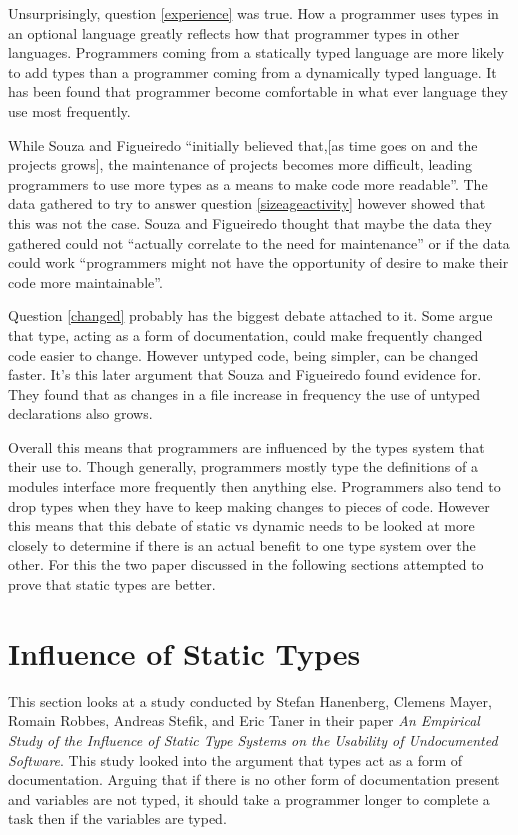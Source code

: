 \documentclass{sig-alternate}
\begin{document}
Unsurprisingly, question \ref{experience} was true. How a programmer uses types in an optional language greatly reflects how that programmer types in other languages. Programmers coming from a statically typed language are more likely to add types than a programmer coming from a dynamically typed language. It has been found that programmer become comfortable in what ever language they use most frequently.

While Souza and Figueiredo ``initially believed that,[as time goes on and the projects grows], the maintenance of projects becomes more difficult, leading programmers to use more types as a means to make code more readable''. The data gathered to try to answer question \ref{sizeageactivity} however showed that this was not the case. Souza and Figueiredo thought that maybe the data they gathered could not ``actually correlate to the need for maintenance'' or if the data could work ``programmers might not have the opportunity of desire to make their code more maintainable''.

Question \ref{changed} probably has the biggest debate attached to it. Some argue that type, acting as a form of documentation, could make frequently changed code easier to change. However untyped code, being simpler, can be changed faster. It's this later argument that Souza and Figueiredo found evidence for. They found that as changes in a file increase in frequency the use of untyped declarations also grows.

Overall this means that programmers are influenced by the types system that their use to. Though generally, programmers mostly type the definitions of a modules interface more frequently then anything else. Programmers also tend to drop types when they have to keep making changes to pieces of code. However this means that this debate of static vs dynamic needs to be looked at more closely to determine if there is an actual benefit to one type system over the other. For this the two paper discussed in the following sections attempted to prove that static types are better. 

\section{Influence of Static Types}\label{influence}
This section looks at a study conducted by Stefan Hanenberg, Clemens Mayer, Romain Robbes, Andreas Stefik, and Eric Taner in their paper \emph{An Empirical Study of the Influence of Static Type Systems on the Usability of Undocumented Software}\cite{Mayer2012}. This study looked into the argument that types act as a form of documentation. Arguing that if there is no other form of documentation present and variables are not typed, it should take a programmer longer to complete a task then if the variables are typed. 
\end{document}
